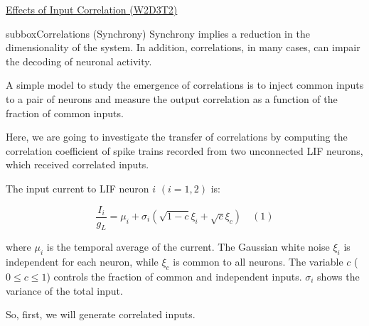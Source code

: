 \begin{textbox}{\href{https://compneuro.neuromatch.io/tutorials/W1D4_GeneralizedLinearModels/student/W1D4_Tutorial1.html}{Effects of Input Correlation (W2D3T2)} }
\begin{subbox}{subbox}{Correlations (Synchrony)}
Synchrony implies a reduction in the dimensionality of the system. In addition, correlations, in many cases, can impair the decoding of neuronal activity.

A simple model to study the emergence of correlations is to inject common inputs to a pair of neurons and measure the output correlation as a function of the fraction of common inputs. 

Here, we are going to investigate the transfer of correlations by computing the correlation coefficient of spike trains recorded from two unconnected LIF neurons, which received correlated inputs.


The input current to LIF neuron $i$ $(i=1,2)$ is:

\begin{equation}
\frac{I_i}{g_L} =\mu_i + \sigma_i (\sqrt{1-c}\xi_i + \sqrt{c}\xi_c) \quad (1)
\end{equation}

where $\mu_i$ is the temporal average of the current. The Gaussian white noise $\xi_i$ is independent for each neuron, while $\xi_c$ is common to all neurons. The variable $c$ ($0\le c\le1$) controls the fraction of common and independent inputs. $\sigma_i$ shows the variance of the total input.

So, first, we will generate correlated inputs.

\end{subbox}

\end{textbox}
